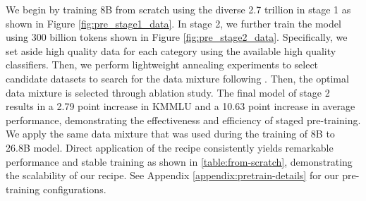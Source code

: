 We begin by training 8B from scratch using the diverse 2.7 trillion in stage 1 as shown in Figure \autoref{fig:pre_stage1_data}.
In stage 2, we further train the model using 300 billion tokens shown in Figure \ref{fig:pre_stage2_data}. 
Specifically, we set aside high quality data for each category using the available high quality classifiers.
Then, we perform lightweight annealing experiments to select candidate datasets to search for the data mixture following \citet{llama3}.
Then, the optimal data mixture is selected through ablation study.
The final model of stage 2 results in a 2.79 point increase in KMMLU and a 10.63 point increase in average performance, demonstrating the effectiveness and efficiency of staged pre-training. 
We apply the same data mixture that was used during the training of 8B to 26.8B model. 
Direct application of the recipe consistently yields remarkable performance and stable training as shown in \autoref{table:from-scratch}, demonstrating the scalability of our recipe. See Appendix \ref{appendix:pretrain-details} for our pre-training configurations.

